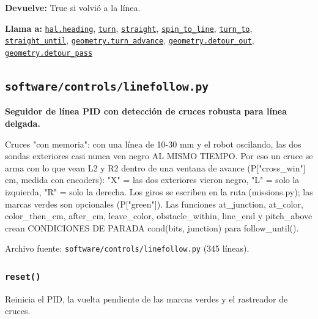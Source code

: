 \par{}\par\smallskip
\noindent\textbf{Devuelve:} True si volvió a la línea.\par
\noindent\textbf{Llama a:} \hyperref[fn:hal:heading]{\texttt{hal.heading}}, \hyperref[fn:motion:turn]{\texttt{turn}}, \hyperref[fn:motion:straight]{\texttt{straight}}, \hyperref[fn:motion:spin-to-line]{\texttt{spin\_\allowbreak{}to\_\allowbreak{}line}}, \hyperref[fn:motion:turn-to]{\texttt{turn\_\allowbreak{}to}}, \hyperref[fn:motion:straight-until]{\texttt{straight\_\allowbreak{}until}}, \hyperref[fn:geometry:turn-advance]{\texttt{geometry.turn\_\allowbreak{}advance}}, \hyperref[fn:geometry:detour-out]{\texttt{geometry.detour\_\allowbreak{}out}}, \hyperref[fn:geometry:detour-pass]{\texttt{geometry.detour\_\allowbreak{}pass}}\par

\subsection{\texttt{software/controls/linefollow.py}}\label{mod:linefollow}
\textbf{Seguidor de línea PID con detección de cruces robusta para línea delgada.}

Cruces "con memoria": con una línea de 10-30 mm y el robot oscilando, las dos sondas exteriores casi nunca ven negro AL MISMO TIEMPO. Por eso un cruce se arma con lo que vean L2 y R2 dentro de una ventana de avance (P["cross\_win"] cm, medida con encoders): "X" = las dos exteriores vieron negro, "L" = solo la izquierda, "R" = solo la derecha. Los giros se escriben en la ruta (missions.py); las marcas verdes son opcionales (P["green"]). Las funciones at\_junction, at\_color, color\_then\_cm, after\_cm, leave\_color, obstacle\_within, line\_end y pitch\_above crean CONDICIONES DE PARADA cond(bits, junction) para follow\_until().

\noindent Archivo fuente: \texttt{software/controls/linefollow.py} (345 l\'ineas).

\subsubsection{\texttt{reset()}}\label{fn:linefollow:reset}
\noindent Reinicia el PID, la vuelta pendiente de las marcas verdes y el rastreador de cruces.

